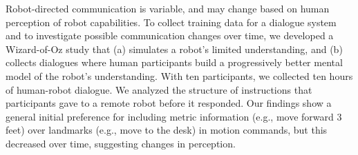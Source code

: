 Robot-directed communication is variable, and may change based on human perception of robot capabilities. To collect training data for a dialogue system and to investigate possible communication changes over time, we developed a Wizard-of-Oz study that (a) simulates a robot's limited understanding, and (b) collects dialogues where human participants build a progressively better mental model of the robot's understanding. With ten participants, we collected ten hours of human-robot dialogue. We analyzed the structure of instructions that participants gave to a remote robot before it responded. Our findings show a general initial preference for including metric information (e.g., move forward 3 feet) over landmarks (e.g., move to the desk) in motion commands, but this decreased over time, suggesting changes in perception.
